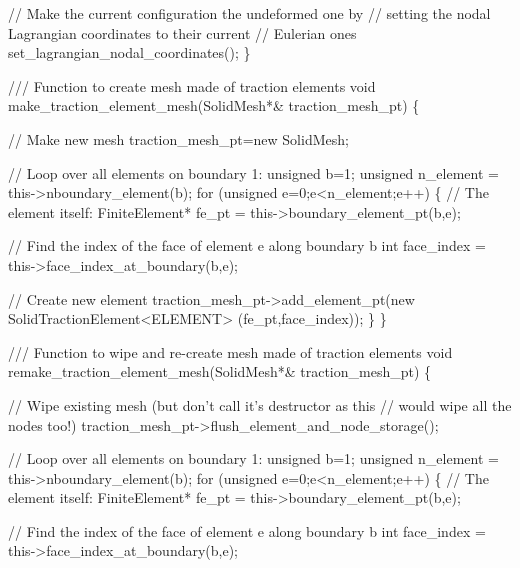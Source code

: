 \begin{DoxyCodeInclude}
   \textcolor{comment}{// Make the current configuration the undeformed one by}
   \textcolor{comment}{// setting the nodal Lagrangian coordinates to their current}
   \textcolor{comment}{// Eulerian ones}
   set\_lagrangian\_nodal\_coordinates();
  \}

\textcolor{comment}{}
\textcolor{comment}{ /// Function to create mesh made of traction elements}
\textcolor{comment}{} \textcolor{keywordtype}{void} make\_traction\_element\_mesh(SolidMesh*& traction\_mesh\_pt)
  \{

   \textcolor{comment}{// Make new mesh}
   traction\_mesh\_pt=\textcolor{keyword}{new} SolidMesh;

   \textcolor{comment}{// Loop over all elements on boundary 1:}
   \textcolor{keywordtype}{unsigned} b=1;
   \textcolor{keywordtype}{unsigned} n\_element = this->nboundary\_element(b);
   \textcolor{keywordflow}{for} (\textcolor{keywordtype}{unsigned} e=0;e<n\_element;e++)
    \{
     \textcolor{comment}{// The element itself:}
     FiniteElement* fe\_pt = this->boundary\_element\_pt(b,e);
     
     \textcolor{comment}{// Find the index of the face of element e along boundary b}
     \textcolor{keywordtype}{int} face\_index = this->face\_index\_at\_boundary(b,e);
     
     \textcolor{comment}{// Create new element}
     traction\_mesh\_pt->add\_element\_pt(\textcolor{keyword}{new} SolidTractionElement<ELEMENT>
                                      (fe\_pt,face\_index));
    \}
  \}

\textcolor{comment}{}
\textcolor{comment}{ /// Function to wipe and re-create mesh made of traction elements}
\textcolor{comment}{} \textcolor{keywordtype}{void} remake\_traction\_element\_mesh(SolidMesh*& traction\_mesh\_pt)
  \{

   \textcolor{comment}{// Wipe existing mesh (but don't call it's destructor as this}
   \textcolor{comment}{// would wipe all the nodes too!)}
   traction\_mesh\_pt->flush\_element\_and\_node\_storage();

   \textcolor{comment}{// Loop over all elements on boundary 1:}
   \textcolor{keywordtype}{unsigned} b=1;
   \textcolor{keywordtype}{unsigned} n\_element = this->nboundary\_element(b);
   \textcolor{keywordflow}{for} (\textcolor{keywordtype}{unsigned} e=0;e<n\_element;e++)
    \{
     \textcolor{comment}{// The element itself:}
     FiniteElement* fe\_pt = this->boundary\_element\_pt(b,e);
     
     \textcolor{comment}{// Find the index of the face of element e along boundary b}
     \textcolor{keywordtype}{int} face\_index = this->face\_index\_at\_boundary(b,e);
     

\end{DoxyCodeInclude}
